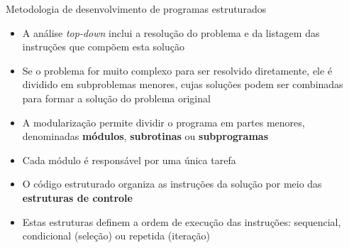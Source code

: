 \begin{frame}[fragile]{Metodologia de desenvolvimento de programas estruturados}

    \begin{itemize}
        \item A análise \textit{top-down} inclui a resolução do problema e da listagem das 
            instruções que compõem esta solução

        \item Se o problema for muito complexo para ser resolvido diretamente, ele é dividido em
            subproblemas menores, cujas soluções podem ser combinadas para formar a solução do
            problema original

        \item A modularização permite dividir o programa em partes menores, denominadas 
            \textbf{módulos}, \textbf{subrotinas} ou \textbf{subprogramas}

        \item Cada módulo é responsável por uma única tarefa

        \item O código estruturado organiza as instruções da solução por meio das 
            \textbf{estruturas de controle}

        \item Estas estruturas definem a ordem de execução das instruções: sequencial, 
            condicional (seleção) ou repetida (iteração)
    \end{itemize}

\end{frame}

